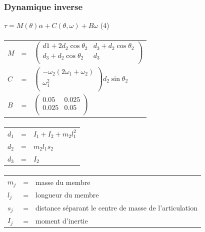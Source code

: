 \documentclass[pdftex,a4paper,11pt]{article}
\begin{document}
\subsubsection{Dynamique inverse}
$\tau = M(\theta)\alpha + C(\theta, \omega) + B\omega $ (4)

\paragraph{}
\begin{tabular}{lcl}
    $M$ & = &
    $
    \begin{pmatrix}
        d1 + 2 d_2 \cos\theta_2  & d_3 + d_2 \cos \theta_2 \\
        d_3 + d_2 \cos\theta_2 & d_3 \\
    \end{pmatrix}
    $ \\

    $C$ & = &
    $
    \begin{pmatrix}
        -\omega_2 (2 \omega_1 + \omega_2) \\
        \omega_1^2 \\
    \end{pmatrix}
    d_2 \sin\theta_2
    $\\

    $B$ & = &
    $
    \begin{pmatrix}
        0.05  & 0.025 \\
        0.025 & 0.05 \\
    \end{pmatrix}
    $
\end{tabular}

\paragraph{}
\begin{tabular}{lcl}
    $d_1$ & = & $I_1 + I_2 + m_2 l_1^2$ \\
    $d_2$ & = & $m_2 l_1 s_2$ \\
    $d_3$ & = & $I_2$ \\
\end{tabular}

\paragraph{}
\begin{tabular}{lcl}
    $m_j$ & = & masse du membre \\
    $l_j$ & = & longueur du membre \\
    $s_{j}$ & = & distance séparant le centre de masse de l'articulation \\
    $I_{j}$ & = & moment d'inertie \\
\end{tabular}
\end{document}
